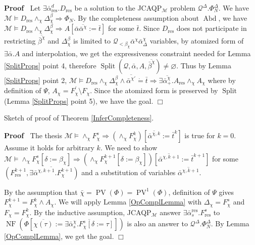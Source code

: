 \documentclass{article}
\newcommand{\assign}{:=}
\newcommand{\tmop}[1]{\ensuremath{\operatorname{#1}}}
\newenvironment{proof}{\noindent\textbf{Proof\ }}{\hspace*{\fill}$\Box$\medskip}
\begin{document}
\begin{proof}
  Let $\exists \bar{\alpha}^d_{\tmop{res}} .D_{\tmop{res}}$ be a solution to
  the JCAQP$_{\mathcal{M}}$ problem $\mathcal{Q}^{\Delta} . \Phi_N^{\Delta}$.
  We have $\mathcal{M} \vDash D_{\tmop{res}} \wedge_{\chi}
  \Delta_{\chi}^{\beta} \Rightarrow \Phi_N$. By the completeness assumption
  about $\tmop{Abd}$, we have $\mathcal{M} \vDash D_{\tmop{res}} \wedge_{\chi}
  \Delta_{\chi}^{\beta} \Rightarrow A [\bar{\alpha}
  \overline{\bar{\alpha}^{\chi}} \assign \bar{t}]$ for some $\bar{t}$. Since
  $D_{\tmop{res}}$ does not participate in restricting
  $\overline{\bar{\beta}^{\chi}}$ and $\Delta_{\chi}^{\beta}$ is limited to
  $\mathcal{Q}_{< \beta_{\chi}} \bar{\alpha}^{\chi}
  \bar{\alpha}^{\chi}_{\Delta}$ variables, by atomized form of $\exists
  \bar{\alpha} .A$ and interpolation, we get the expressiveness constraint
  needed for Lemma \ref{SplitProps} point 4, therefore $\tmop{Split}
  (\mathcal{Q}, \bar{\alpha}, A, \overline{\bar{\beta}^{\chi}}) \neq
  \varnothing$. Thus by Lemma \ref{SplitProps} point 2, $\mathcal{M} \vDash
  D_{\tmop{res}} \wedge_{\chi} \Delta_{\chi}^{\beta} \wedge
  \overline{\bar{\alpha}^{\chi \prime}} \dot{=} \bar{t} \Rightarrow \exists
  \overline{\bar{\alpha}^{\chi}_+} .A_{\tmop{res}} \wedge_{\chi} A_{\chi}$
  where by definition of $\Psi$, $A_{\chi} = F^{\prime}_{\chi} \setminus
  F_{\chi}$. Since the atomized form is preserved by $\tmop{Split}$ (Lemma
  \ref{SplitProps} point 5), we have the goal.
\end{proof}

Sketch of proof of Theorem \ref{InferCompleteness}.

\begin{proof}
  The thesis $\mathcal{M} \vDash \wedge_{\chi} F^s_{\chi} \Rightarrow
  (\wedge_{\chi} F^k_{\chi}) [\overline{\bar{\alpha}^{\chi, k}} \assign
  \bar{t}^k]$ is true for $k = 0$. Assume it holds for arbitrary $k$. We need
  to show $\mathcal{M} \vDash \wedge_{\chi} F^s_{\chi} [\delta \assign
  \beta_{\chi}] \Rightarrow (\wedge_{\chi} F^{k + 1}_{\chi} [\delta \assign
  \beta_{\chi}]) [\overline{\bar{\alpha}^{\chi, k + 1}} \assign \bar{t}^{k +
  1}]$ for some $(F_{\tmop{res}}^{k + 1}, \overline{\exists
  \bar{\alpha}^{\chi, k + 1} .F_{\chi}^{k + 1}})$ and a substitution of
  variables $\overline{\bar{\alpha}^{\chi, k + 1}}$.
  
  By the assumption that $\bar{\chi} = \tmop{PV} (\Phi) = \tmop{PV}^1 (\Phi)$,
  definition of $\Psi$ gives $F_{\chi}^{k + 1} = F_{\chi}^k \wedge A_{\chi}$.
  We will apply Lemma \ref{OpComplLemma} with $\Delta_{\chi} = F_{\chi}^s$ and
  $F_{\chi} = F^k_{\chi}$. By the inductive assumption, JCAQP$_{\mathcal{M}}$
  answer $\exists \bar{\alpha}^{\tmop{res}}_s .F_{\tmop{res}}^s$ to $\tmop{NF}
  (\Phi [\overline{\chi (\tau)} \assign \overline{\exists
  \bar{\alpha}^{\chi}_s .F_{\chi}^s [\delta \assign \tau]}])$ is also an
  answer to $\mathcal{Q}^{\Delta} . \Phi_N^{\Delta}$. By Lemma
  \ref{OpComplLemma}, we get the goal.
\end{proof}
\end{document}
